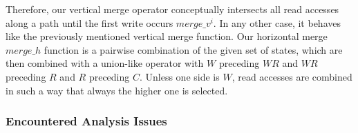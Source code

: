 Therefore, our vertical merge operator conceptually intersects all read accesses along a path until the first write 
occurs $merge\_v^{i}$. In any other case, it behaves like the previously mentioned vertical merge function.
Our horizontal merge $merge\_h$ function is a pairwise combination of the given set of states, which are then combined with a union-like operator 
with $W$ preceding $WR$ and $WR$ preceding $R$ and $R$ preceding $C$. Unless one side is $W$, read accesses are combined in such a way that always the higher one is selected.

%

\subsubsection{Encountered Analysis Issues}

